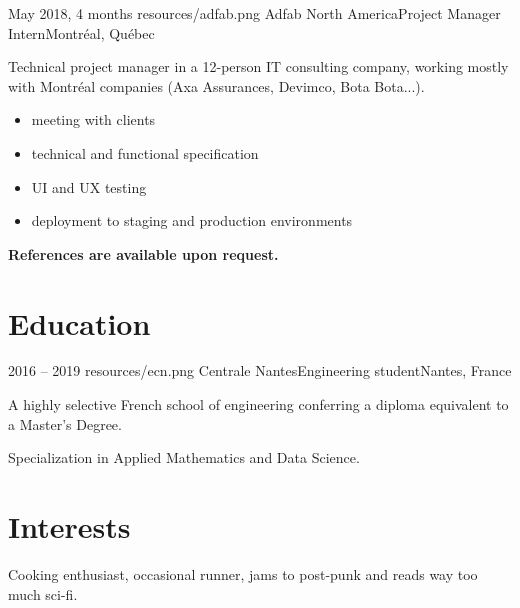 \documentclass{cv}
\begin{document}
\experience
{{May 2018,  4 months}}
{resources/adfab.png}
{Adfab North America}{Project Manager Intern}{Montréal, Québec}{

Technical project manager in a 12-person IT consulting company, working mostly with Montréal companies (Axa Assurances, Devimco, Bota Bota...).

\begin{itemize}
	\item meeting with clients
	\item technical and functional specification
	\item UI and UX testing
	\item deployment to staging and production environments
\end{itemize}
}

\begin{center}
	\bfseries References are available upon request.
\end{center}


\pagestyle{withheader}

\section{Education}

\experience
{{2016 -- 2019}}
{resources/ecn.png}
{Centrale Nantes}{Engineering student}{Nantes, France}{

A highly selective French school of engineering conferring a diploma equivalent to a Master’s Degree. 

Specialization in Applied Mathematics and Data Science.
}
	
\section{Interests}
	
Cooking enthusiast, occasional runner, jams to post-punk and reads way too much sci-fi. 
\end{document}
